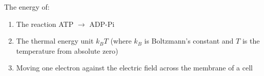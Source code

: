 \documentclass[
  letterpaper,
  DIV=11,
  numbers=noendperiod]{scrartcl}
\providecommand{\tightlist}{%
  \setlength{\itemsep}{0pt}\setlength{\parskip}{0pt}}
\begin{document}
The energy of:

\begin{enumerate}
\def\labelenumi{\arabic{enumi}.}
\setcounter{enumi}{17}
\tightlist
\item
  The reaction ATP \(\rightarrow\) ADP-Pi
\item
  The thermal energy unit \(k_B T\) (where \(k_B\) is Boltzmann's constant and \(T\) is the temperature from absolute zero)
\item
  Moving one electron against the electric field across the membrane of a cell
\end{enumerate}
\end{document}
